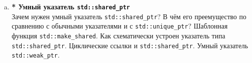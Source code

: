 \documentclass{article}
\begin{document}
\begin{enumerate}
\begin{enumerate}[a.]
\item \textbf{* Умный указатель \texttt{std::shared\_ptr}}\\
Зачем нужен умный указатель \texttt{std::shared\_ptr}? В чём его преемущество по сравнению с обычными указателями и с \texttt{std::unique\_ptr}? Шаблонная функция \texttt{std::make\_shared}. Как схематически устроен указатель типа \texttt{std::shared\_ptr}. Циклические ссылки и \texttt{std::shared\_ptr}. Умный указатель \texttt{std::weak\_ptr}.


\end{enumerate}

\end{enumerate}
\end{document}
